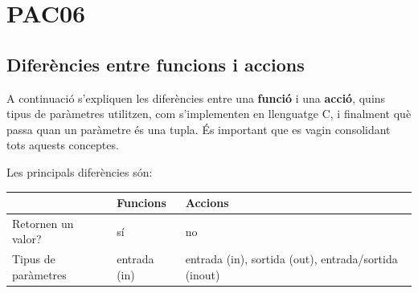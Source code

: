 \documentclass[]{book}
\begin{document}
\chapter{PAC06}\label{pac06}

\section{Diferències entre funcions i
accions}\label{diferencies-entre-funcions-i-accions}

A continuació s'expliquen les diferències entre una \textbf{funció} i
una \textbf{acció}, quins tipus de paràmetres utilitzen, com
s'implementen en llenguatge C, i finalment què passa quan un paràmetre
és una tupla. És important que es vagin consolidant tots aquests
conceptes.

Les principals diferències són:

\begin{longtable}[]{@{}lll@{}}
\toprule
\begin{minipage}[b]{0.24\columnwidth}\raggedright\strut
\strut
\end{minipage} & \begin{minipage}[b]{0.11\columnwidth}\raggedright\strut
Funcions\strut
\end{minipage} & \begin{minipage}[b]{0.10\columnwidth}\raggedright\strut
Accions\strut
\end{minipage}\tabularnewline
\midrule
\endhead
\begin{minipage}[t]{0.24\columnwidth}\raggedright\strut
Retornen un valor?\strut
\end{minipage} & \begin{minipage}[t]{0.11\columnwidth}\raggedright\strut
sí\strut
\end{minipage} & \begin{minipage}[t]{0.10\columnwidth}\raggedright\strut
no\strut
\end{minipage}\tabularnewline
\begin{minipage}[t]{0.24\columnwidth}\raggedright\strut
Tipus de paràmetres\strut
\end{minipage} & \begin{minipage}[t]{0.11\columnwidth}\raggedright\strut
entrada (in)\strut
\end{minipage} & \begin{minipage}[t]{0.10\columnwidth}\raggedright\strut
entrada (in), sortida (out), entrada/sortida (inout)\strut
\end{minipage}\tabularnewline
\bottomrule
\end{longtable}
\end{document}
